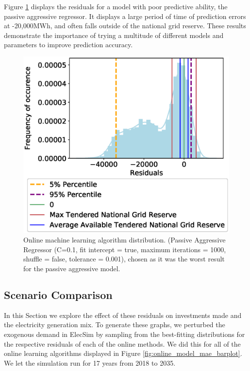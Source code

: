 \documentclass[final,3p,times,twocolumn,numbers]{elsarticle}
\begin{document}
Figure \ref{fig:bad_online_learning_day_distribution} displays the residuals for a model with poor predictive ability, the passive aggressive regressor. It displays a large period of time of prediction errors at -20,000MWh, and often falls outside of the national grid reserve. These results demonstrate the importance of trying a multitude of different models and parameters to improve prediction accuracy.

\begin{figure}
\centering
\includegraphics[width=\columnwidth,natwidth=500,natheight=500]{figures/results/online_learning_dists-C-0.1-fit_intercept-true-max_iter-1000-shuffle-false-tol 0.001.eps}
\caption{Online machine learning algorithm distribution. (Passive Aggressive Regressor (C=0.1, fit intercept = true, maximum iterations = 1000, shuffle = false, tolerance = 0.001), chosen as it was the worst result for the passive aggressive model.}
\label{fig:bad_online_learning_day_distribution}
\end{figure}




\subsection{Scenario Comparison}

In this Section we explore the effect of these residuals on investments made and the electricity generation mix.  To generate these graphs, we perturbed the exogenous demand in ElecSim by sampling from the best-fitting distributions for the respective residuals of each of the online methods. We did this for all of the online learning algorithms displayed in Figure \ref{fig:online_model_mae_barplot}. We let the simulation run for 17 years from 2018 to 2035. 
\end{document}
